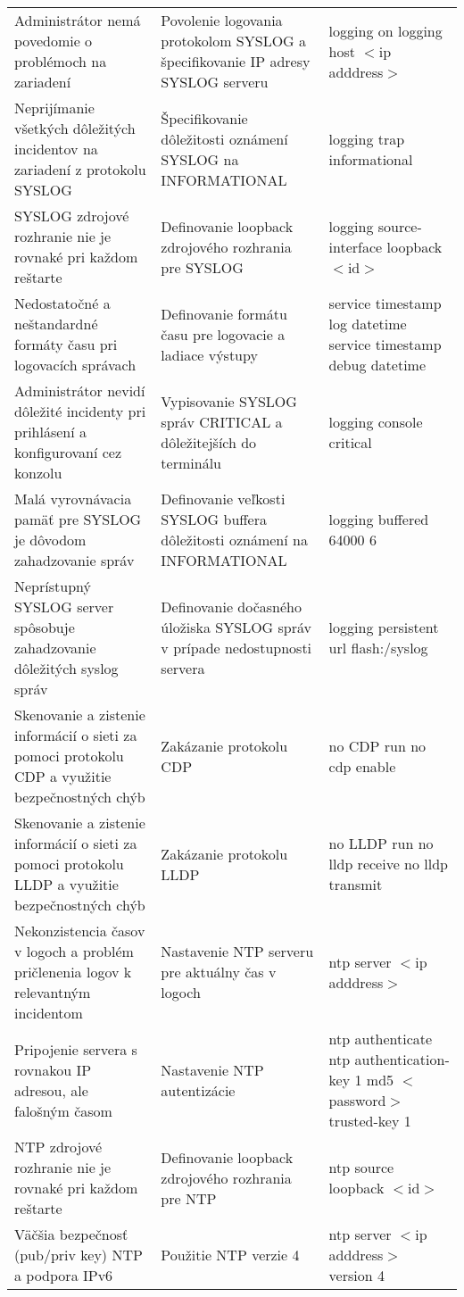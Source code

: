 \begin{longtable}[!htbp]{|L{10em}L{10em}L{34em}|}
	Administrátor nemá povedomie o problémoch na zariadení	&Povolenie logovania protokolom SYSLOG a špecifikovanie IP adresy SYSLOG serveru	&logging on
	logging host $<$ip adddress$>$\\
	Neprijímanie všetkých dôležitých incidentov na zariadení z protokolu SYSLOG	&Špecifikovanie dôležitosti oznámení SYSLOG na INFORMATIONAL	&logging trap informational\\
	SYSLOG zdrojové rozhranie nie je rovnaké pri každom reštarte	& Definovanie loopback zdrojového rozhrania pre SYSLOG	&logging source-interface loopback $<$id$>$\\
	Nedostatočné a neštandardné formáty času pri logovacích správach	&Definovanie formátu času pre logovacie a ladiace výstupy	&service timestamp log datetime
	service timestamp debug datetime\\
	Administrátor nevidí dôležité incidenty pri prihlásení a konfigurovaní cez konzolu	&Vypisovanie SYSLOG správ CRITICAL a dôležitejších do terminálu	&logging console critical\\
	Malá vyrovnávacia pamäť pre SYSLOG je dôvodom zahadzovanie správ	&Definovanie veľkosti SYSLOG buffera dôležitosti oznámení na INFORMATIONAL	&logging buffered 64000 6\\
	Neprístupný SYSLOG server spôsobuje zahadzovanie dôležitých syslog správ	&Definovanie dočasného úložiska SYSLOG správ v prípade nedostupnosti servera	&logging persistent url flash:/syslog\\
	Skenovanie a zistenie informácií o sieti za pomoci protokolu CDP a využitie bezpečnostných chýb	&Zakázanie protokolu CDP	&no CDP run 
	no cdp enable\\
	Skenovanie a zistenie informácií o sieti za pomoci protokolu LLDP a využitie bezpečnostných chýb	&Zakázanie protokolu LLDP	&no LLDP run 
	no lldp receive 
	no lldp transmit\\
	Nekonzistencia časov v logoch a problém pričlenenia logov k relevantným incidentom	&Nastavenie NTP serveru pre aktuálny čas v logoch	&ntp server $<$ip adddress$>$\\
	Pripojenie servera s rovnakou IP adresou, ale falošným časom	&Nastavenie NTP autentizácie	&ntp authenticate
	ntp authentication-key 1 md5 $<$password$>$
	trusted-key 1\\
	NTP zdrojové rozhranie nie je rovnaké pri každom reštarte	& Definovanie loopback zdrojového rozhrania pre NTP	&ntp source loopback $<$id$>$\\
	Väčšia bezpečnosť (pub/priv key) NTP a podpora IPv6	&Použitie NTP verzie 4	&ntp server $<$ip adddress$>$ version 4\\

\end{longtable}
